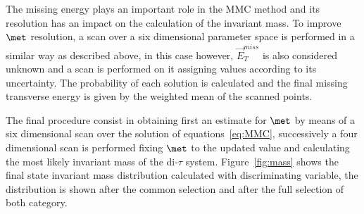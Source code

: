 The missing energy plays an important role in the MMC method and  its resolution has an impact on the calculation
of the invariant mass. To improve $\met$ resolution, a scan over a six dimensional parameter space is performed 
in a similar way as described above, in this case however, $\vec{E}_T^{miss}$ is also considered unknown and a scan 
is performed on it assigning values  according to its uncertainty. 
The probability of each solution is calculated and the final missing transverse
energy is given by the weighted mean of the scanned points. 

The final procedure consist in obtaining first an estimate for $\met$ by means of a six dimensional scan over the solution of equations~\ref{eq:MMC},
successively a four dimensional scan is performed fixing $\met$ to the updated value and calculating the most likely invariant mass 
of the di-$\tau$ system.
Figure~\ref{fig:mass} shows the final state invariant mass distribution calculated with  \mmc 
discriminating variable, the distribution is shown after the common selection and after the full selection
of both category. 

 


